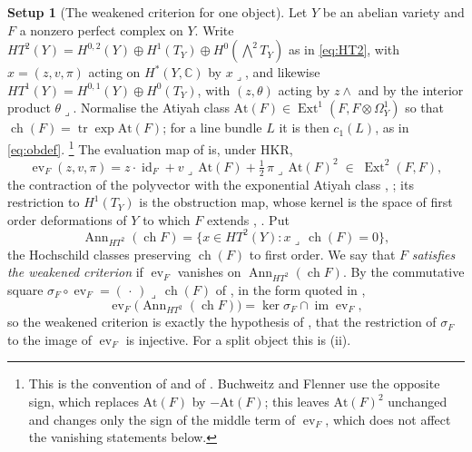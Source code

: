 \documentclass[11pt,reqno]{amsart}
\theoremstyle{plain}
\theoremstyle{definition}
\newtheorem{setupenv}[theorem]{Setup}
\theoremstyle{remark}
\newcommand{\CC}{\mathbb{C}}
\DeclareMathOperator{\ch}{ch}
\DeclareMathOperator{\Ext}{Ext}
\DeclareMathOperator{\image}{im}
\DeclareMathOperator{\id}{id}
\DeclareMathOperator{\Ann}{Ann}
\begin{document}
\begin{setupenv}[The weakened criterion for one object]\label{setup:criterion}
Let $Y$ be an abelian variety and $F$ a nonzero perfect complex on $Y$. Write
$HT^{2}(Y)=H^{0,2}(Y)\oplus H^{1}(T_{Y})\oplus H^{0}(\bigwedge^{2}T_{Y})$ as
in \eqref{eq:HT2}, with $x=(z,v,\pi)$ acting on $H^{*}(Y,\CC)$ by
$x\lrcorner$, and likewise $HT^{1}(Y)=H^{0,1}(Y)\oplus H^{0}(T_{Y})$, with
$(z,\theta)$ acting by $z\wedge$ and by the interior product $\theta\lrcorner$.
Normalise the Atiyah class $\mathrm{At}(F)\in\Ext^{1}(F,F\otimes\Omega^{1}_{Y})$
so that $\ch(F)=\operatorname{tr}\exp\mathrm{At}(F)$; for a line bundle $L$
it is then $c_{1}(L)$, as in \eqref{eq:obdef}.%
\footnote{This is the convention of \cite{Tod09} and of
\cite[footnote 14]{Mar25a}. Buchweitz and Flenner use the opposite sign,
which replaces $\mathrm{At}(F)$ by $-\mathrm{At}(F)$; this leaves
$\mathrm{At}(F)^{2}$ unchanged and changes only the sign of the middle term
of $\operatorname{ev}_{F}$, which does not affect the vanishing statements
below.}
The evaluation map of \cite[Theorem~9.19]{paperI} is, under HKR,
\begin{equation}\label{eq:evgeneral}
  \operatorname{ev}_{F}(z,v,\pi)=z\cdot\id_{F}+v\lrcorner\,\mathrm{At}(F)
  +\tfrac12\,\pi\lrcorner\,\mathrm{At}(F)^{2}\;\in\;\Ext^{2}(F,F),
\end{equation}
the contraction of the polyvector with the exponential Atiyah class
\cite[Theorem A]{Hua21}, \cite{BF08}; its restriction to $H^{1}(T_{Y})$ is the
obstruction map, whose kernel is the space of first order deformations of $Y$
to which $F$ extends \cite{Tod09}, \cite[Section 8.3]{Mar25a}. Put
\[
  \Ann_{HT^{2}}(\ch F)=\bigl\{x\in HT^{2}(Y):x\lrcorner\,\ch(F)=0\bigr\},
\]
the Hochschild classes preserving $\ch(F)$ to first order. We say that $F$
\emph{satisfies the weakened criterion} if $\operatorname{ev}_{F}$ vanishes on
$\Ann_{HT^{2}}(\ch F)$. By the commutative square
$\sigma_{F}\circ\operatorname{ev}_{F}=(\,\cdot\,)\lrcorner\,\ch(F)$ of
\cite[Proposition 6.2.1 and Corollary 6.3.2]{BF08}, in the form quoted in
\cite[Lemma 11.3]{Mar25b},
\[
  \operatorname{ev}_{F}\bigl(\Ann_{HT^{2}}(\ch F)\bigr)
  =\ker\sigma_{F}\cap\image\operatorname{ev}_{F},
\]
so the weakened criterion is exactly the hypothesis of
\cite[Question 11.4]{Mar25b}, that the restriction of $\sigma_{F}$ to the
image of $\operatorname{ev}_{F}$ is injective. For a split object this is
(ii).
\end{setupenv}
\end{document}
